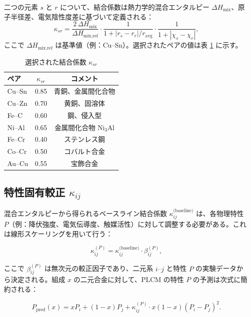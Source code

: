 \documentclass[11pt,a4paper]{article}
\theoremstyle{remark}
\begin{document}
	二つの元素 \(s\) と \(r\) について、結合係数は熱力学的混合エンタルピー \(\Delta H_{\text{mix}}\)、原子半径差、電気陰性度差に基づいて定義される：
	\[
	\kappa_{sr} = \frac{2\,\Delta H_{\text{mix}}}{\Delta H_{\text{mix,ref}}} \cdot
	\frac{1}{1 + |r_s - r_r|/r_{\text{avg}}} \cdot
	\frac{1}{1 + |\chi_s - \chi_r|},
	\]
	ここで \(\Delta H_{\text{mix,ref}}\) は基準値（例：Cu–Sn）。選択されたペアの値は表 \ref{tab:kappa} に示す。
	
	\begin{table}[htbp]
		\centering
		\caption{選択された結合係数 \(\kappa_{sr}\)}
		\label{tab:kappa}
		\begin{tabular}{lcc}
			\toprule
			ペア & \(\kappa_{sr}\) & コメント \\
			\midrule
			Cu–Sn & 0.85 & 青銅、金属間化合物 \\
			Cu–Zn & 0.70 & 黄銅、固溶体 \\
			Fe–C  & 0.60 & 鋼、侵入型 \\
			Ni–Al & 0.65 & 金属間化合物 Ni\(_{3}\)Al \\
			Fe–Cr & 0.40 & ステンレス鋼 \\
			Co–Cr & 0.50 & コバルト合金 \\
			Au–Cu & 0.55 & 宝飾合金 \\
			\bottomrule
		\end{tabular}
	\end{table}
	
	\subsection{特性固有較正 \(\kappa_{ij}\)}
	\label{subsec:property-calibration}
	
	混合エンタルピーから得られるベースライン結合係数 \(\kappa_{ij}^{\text{(baseline)}}\) は、各物理特性 \(P\)（例：降伏強度、電気伝導度、触媒活性）に対して調整する必要がある。これは線形スケーリングを用いて行う：
	
	\begin{equation}
		\kappa_{ij}^{(P)} = \kappa_{ij}^{\text{(baseline)}} \cdot \beta_{ij}^{(P)},
		\label{eq:kappa-calibration}
	\end{equation}
	
	ここで \(\beta_{ij}^{(P)}\) は無次元の較正因子であり、二元系 \(i\)–\(j\) と特性 \(P\) の実験データから決定される。組成 \(x\) の二元合金に対して、PLCM の特性 \(P\) の予測は次式に簡約される：
	
	\begin{equation}
		P_{\text{pred}}(x) = x P_i + (1-x) P_j + \kappa_{ij}^{(P)} \cdot x(1-x) (P_i - P_j)^2.
		\label{eq:binary-prediction}
	\end{equation}
	
\end{document}
